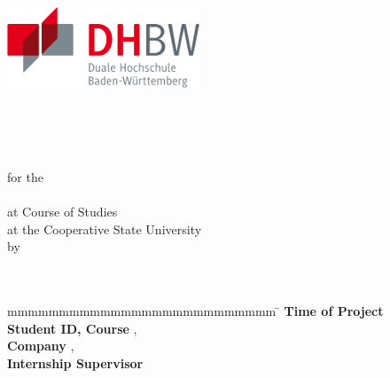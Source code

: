 \begin{titlepage}
    \pagestyle{plain}
    \begin{center}
	    \includegraphics[height=2.4cm]{./images/DHBW_Logo.png}
	\end{center}
	\enlargethispage{20mm}
	\begin{center}
	    \begin{spacing}{1.5}
	      \vspace*{5mm}	{\LARGE\bf \titel }\\
	      \vspace*{3mm}{\large \subtitel }\\
	    \end{spacing}
	 \end{center}
	 \begin{center}
	    \vspace*{5mm}	{\large\bf \arbeit}\\
        \vspace*{9mm}	for the\\
	    \vspace*{3mm} 	{\bf \abschluss}\\
	    \vspace*{12mm}	at Course of Studies \studiengang\\
	    \vspace*{1mm} 	at the Cooperative State University \dhbw\\
	    \vspace*{12mm}	by\\
	    \vspace*{3mm} 	{\large\bf \autor}\\
	    \vspace*{12mm}	\datumAbgabe\\
	\end{center}
	\vfill
	\begin{spacing}{1.2}
	    \begin{tabbing}
		    mmmmmmmmmmmmmmmmmmmmmmmmmm     \= \kill
		    \textbf{Time of Project}  \>  \zeitraum\\
		    \textbf{Student ID, Course}  \>  \matrikelnr, \kurs\\
		    \textbf{Company}      \>  \firma, \firmenort\\
		    \textbf{Internship Supervisor}              \>  \betreuer
	    \end{tabbing}
	\end{spacing}
\end{titlepage}
